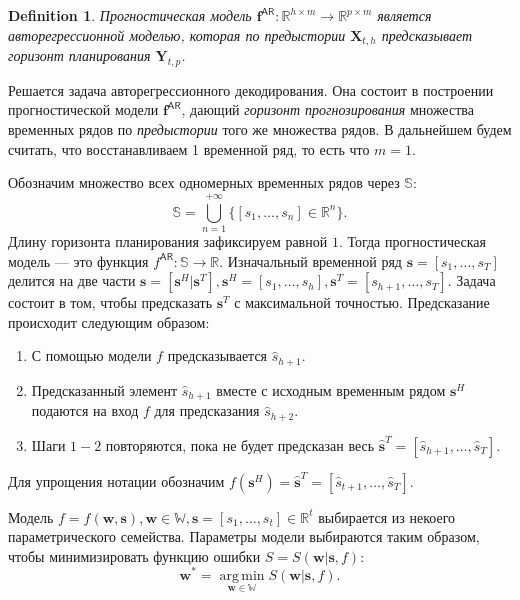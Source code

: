 \documentclass[12pt, twoside]{article}
\newtheorem{definition}{Definition}
\DeclareMathOperator*{\argmin}{arg\,min}
\begin{document}
\begin{definition}
Прогностическая модель $\mathbf{f}^{\mathsf{AR}}: \mathbb{R}^{h \times m} \to \mathbb{R}^{p \times m}$ является авторегрессионной моделью, которая по предыстории $\mathbf{X}_{t, h}$ предсказывает горизонт планирования $\mathbf{Y}_{t, p}$.
\end{definition}

\begin{comment}
\end{comment}

Решается задача авторегрессионного декодирования. Она состоит в построении прогностической модели $\mathbf{f}^{\mathsf{AR}}$, дающий \textit{горизонт прогнозирования} множества временных рядов по \textit{предыстории} того же множества рядов. В дальнейшем будем считать, что восстанавливаем 1 временной ряд, то есть что $m=1$.

Обозначим множество всех одномерных временных рядов через $\mathbb{S}$: \[\mathbb{S} = \bigcup\limits_{n=1}^{+\infty}\{[s_1, \dots, s_n] \in \mathbb{R}^{n}\}.\] Длину горизонта планирования зафиксируем равной $1$. Тогда прогностическая модель --- это функция $f^{\mathsf{AR}}: \mathbb{S} \to \mathbb{R}$. Изначальный временной ряд $\mathbf{s} = [s_1, \dots, s_T]$ делится на две части $\mathbf{s} = [\mathbf{s}^H|\mathbf{s}^T], \mathbf{s}^H = [s_1, \dots, s_h], \mathbf{s}^T = [s_{h+1}, \dots, s_T]$. Задача состоит в том, чтобы предсказать $\mathbf{s}^T$ с максимальной точностью. Предсказание происходит следующим образом:

\begin{enumerate}
    \item С помощью модели $f$ предсказывается $\hat{s}_{h+1}$.
    \item Предсказанный элемент $\hat{s}_{h+1}$ вместе с исходным временным рядом $\mathbf{s}^H$ подаются на вход $f$ для предсказания $\hat{s}_{h+2}$.
    \item Шаги $1-2$ повторяются, пока не будет предсказан весь $\hat{\mathbf{s}}^T=[\hat{s}_{h+1}, \dots, \hat{s}_{T}]$.
\end{enumerate}

Для упрощения нотации обозначим $f(\mathbf{s}^H)=\hat{\mathbf{s}}^T = [\hat{s}_{t+1}, \dots, \hat{s}_{T}]$.

Модель $f = f(\mathbf{w}, \mathbf{s}), \mathbf{w} \in \mathbb{W}, \mathbf{s}=[s_1, \dots, s_t]\in \mathbb{R}^t$ выбирается из некоего параметрического семейства.
Параметры модели выбираются таким образом, чтобы минимизировать функцию ошибки $S=S(\mathbf{w}|\mathbf{s},f)$:
$$
\mathbf{w^*} = \argmin\limits_{\mathbf{w} \in \mathbb{W}} S(\mathbf{w}|\mathbf{s},f).
$$
\end{document}
